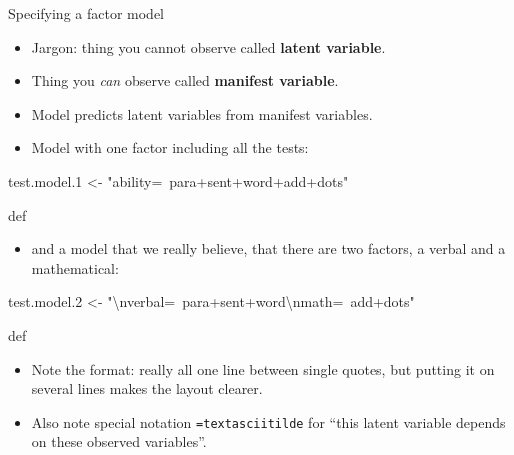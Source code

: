 \documentclass[ignorenonframetext,]{beamer}
\newenvironment{Shaded}{\begin{snugshade}}{\end{snugshade}}
\newcommand{\CharTok}[1]{\textcolor[rgb]{0.31,0.60,0.02}{#1}}
\newcommand{\FloatTok}[1]{\textcolor[rgb]{0.00,0.00,0.81}{#1}}
\newcommand{\NormalTok}[1]{#1}
\newcommand{\StringTok}[1]{\textcolor[rgb]{0.31,0.60,0.02}{#1}}
\providecommand{\tightlist}{%
  \setlength{\itemsep}{0pt}\setlength{\parskip}{0pt}}
\begin{document}
\begin{frame}[fragile]{Specifying a factor model}
\protect\hypertarget{specifying-a-factor-model}{}

\begin{itemize}
\item
  Jargon: thing you cannot observe called \textbf{latent variable}.
\item
  Thing you \emph{can} observe called \textbf{manifest variable}.
\item
  Model predicts latent variables from manifest variables.
\item
  Model with one factor including all the tests:
\end{itemize}

\begin{Shaded}
\begin{Highlighting}[]
\NormalTok{test.model}\FloatTok{.1}\NormalTok{ <-}\StringTok{ "ability=~para+sent+word+add+dots"}
\end{Highlighting}
\end{Shaded}

def

\begin{itemize}
\tightlist
\item
  and a model that we really believe, that there are two factors, a
  verbal and a mathematical:
\end{itemize}

\begin{Shaded}
\begin{Highlighting}[]
\NormalTok{test.model}\FloatTok{.2}\NormalTok{ <-}\StringTok{ "}\CharTok{\textbackslash{}n}\StringTok{verbal=~para+sent+word}\CharTok{\textbackslash{}n}\StringTok{math=~add+dots"}
\end{Highlighting}
\end{Shaded}

def

\begin{itemize}
\item
  Note the format: really all one line between single quotes, but
  putting it on several lines makes the layout clearer.
\item
  Also note special notation \texttt{=textasciitilde} for ``this latent
  variable depends on these observed variables''.
\end{itemize}

\end{frame}
\end{document}
